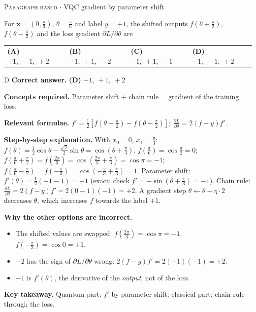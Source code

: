 \documentclass[11pt,a4paper]{article}
\newcommand{\optlabel}[1]{\textbf{(#1)}}
\newcommand{\correctlabel}[1]{\textcolor{okgreen}{\textbf{(#1)}\,\ding{51}}}
\newenvironment{qitem}[1]{\begin{list}{}{\setlength{\leftmargin}{3.3em}\setlength{\labelwidth}{3.1em}%
  \setlength{\labelsep}{0.2em}\setlength{\topsep}{3pt}\setlength{\parsep}{3pt}}\item[\textbf{Q.#1}\hfill]}{\end{list}}
\newcommand{\qsep}{\par\vspace{2pt}{\color{black!15}\hrule}\vspace{4pt}}
\newcommand{\qmeta}[2]{{\footnotesize\color{black!60}\textsc{#1} \;$\cdot$\; #2}\par}
\begin{document}
\begin{qitem}{60}
\qmeta{Paragraph based}{VQC gradient by parameter shift}
For $\mathbf x = (0, \frac\pi3)$, $\theta = \frac\pi6$ and label $y = +1$, the shifted outputs $f(\theta + \frac\pi2)$, $f(\theta - \frac\pi2)$ and
the loss gradient $\partial L/\partial\theta$ are
\par\smallskip\noindent\begin{tabularx}{\linewidth}{@{}*{4}{L}@{}}
\optlabel{A}\,$+1,\ -1,\ +2$ & \optlabel{B}\,$-1,\ +1,\ -2$ & \optlabel{C}\,$-1,\ +1,\ -1$ & \correctlabel{D}\,$-1,\ +1,\ +2$
\end{tabularx}
\end{qitem}
\begin{solbox}{D}
\textbf{\color{brand}Correct answer.} \textcolor{okgreen}{\textbf{(D)}} $-1,\ +1,\ +2$

\textbf{\color{brand}Concepts required.} Parameter shift + chain rule = gradient of the training loss.

\textbf{\color{brand}Relevant formulae.} $f' = \frac12[f(\theta + \frac\pi2) - f(\theta - \frac\pi2)]$; $\frac{\partial L}{\partial\theta} = 2(f - y)f'$.

\textbf{\color{brand}Step-by-step explanation.} With $x_0 = 0$, $x_1 = \frac\pi3$: $f(\theta) = \frac12\cos\theta - \frac{\sqrt3}{2}\sin\theta = \cos(\theta + \frac\pi3)$.
$f(\frac\pi6) = \cos\frac\pi2 = 0$; $f(\frac\pi6 + \frac\pi2) = f(\frac{2\pi}3) = \cos(\frac{2\pi}3 + \frac\pi3) = \cos\pi = -1$;
$f(\frac\pi6 - \frac\pi2) = f(-\frac\pi3) = \cos(-\frac\pi3 + \frac\pi3) = 1$.
Parameter shift: $f'(\theta) = \frac12(-1 - 1) = -1$ (exact; check $f' = -\sin(\theta + \frac\pi3) = -1$).
Chain rule: $\frac{\partial L}{\partial\theta} = 2(f - y)f' = 2(0 - 1)(-1) = +2$. A gradient step $\theta \leftarrow \theta - \eta\cdot2$ decreases $\theta$,
which increases $f$ towards the label $+1$.

\textbf{\color{brand}Why the other options are incorrect.}
\begin{itemize}[leftmargin=2.4em, itemsep=1pt, topsep=2pt]
\item[\textbf{(A)}] The shifted values are swapped: $f(\frac{2\pi}{3}) = \cos\pi = -1$, $f(-\frac\pi3) = \cos0 = +1$.
\item[\textbf{(B)}] $-2$ has the sign of $\partial L/\partial\theta$ wrong: $2(f - y)f' = 2(-1)(-1) = +2$.
\item[\textbf{(C)}] $-1$ is $f'(\theta)$, the derivative of the \emph{output}, not of the loss.
\end{itemize}
\textbf{\color{brand}Key takeaway.} Quantum part: $f'$ by parameter shift; classical part: chain rule through the loss.
\end{solbox}
\qsep
\end{document}
